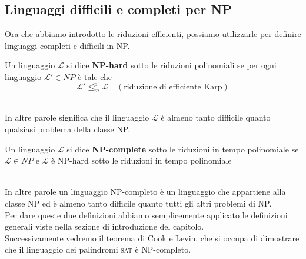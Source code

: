 \subsection{Linguaggi difficili e completi per NP}
Ora che abbiamo introdotto le riduzioni efficienti, possiamo utilizzarle per definire linguaggi completi e difficili in NP. \smallskip\\
\colorbox{SALZO}{\parbox{\dimexpr\linewidth-2\fboxsep}{\begin{definition}
    Un linguaggio $\mathcal{L}$ si dice \textbf{NP-hard} sotto le riduzioni polinomiali se per ogni linguaggio $\mathcal{L}'\in NP$ è tale che  
    \[\mathcal{L}' \le^{p}_{m} \mathcal{L} \quad(\text{riduzione di efficiente Karp}) \]
\end{definition}}}\smallskip\\
In altre parole significa che il linguaggio $\mathcal{L}$ è almeno tanto difficile quanto qualsiasi problema della classe NP.\smallskip\\
\colorbox{SALZO}{\parbox{\dimexpr\linewidth-2\fboxsep}{\begin{definition}
    Un linguaggio $\mathcal{L}$ si dice \textbf{NP-complete} sotto le riduzioni in tempo polinomiale se $\mathcal{L} \in NP$ e $\mathcal{L} $ è NP-hard 
    sotto le riduzioni in tempo polinomiale 
\end{definition}}}\smallskip\\
In altre parole un linguaggio NP-completo è un linguaggio che appartiene alla classe NP ed è almeno tanto difficile quanto tutti gli altri problemi di NP.\smallskip\\
Per dare queste due definizioni abbiamo semplicemente applicato le definizioni generali viste nella sezione di introduzione del capitolo.\\
Successivamente vedremo il teorema di Cook e Levin, che si occupa di dimostrare che il linguaggio dei palindromi \textsc{sat} è NP-completo. 



